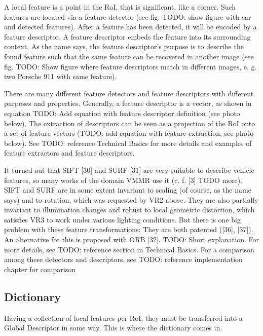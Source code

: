 A local feature is a point in the RoI, that is significant, like a corner. Such features are located via a feature detector (see fig. TODO: show figure with car and detected features). After a feature has been detected, it will be encoded by a feature descriptor. A feature descriptor embeds the feature into its surrounding context. As the name says, the feature descriptor’s purpose is to describe the found feature such that the same feature can be recovered in another image (see fig. TODO: Show figure where feature descriptors match in different images, e. g. two Porsche 911 with same feature).

There are many different feature detectors and feature descriptors with different purposes and properties. Generally, a feature descriptor is a vector, as shown in equation TODO: Add equation with feature descriptor definition (see photo below). The extraction of descriptors can be seen as a projection of the RoI onto a set of feature vectors (TODO: add equation with feature extraction, see photo below). See TODO: reference Technical Basics for more details and examples of feature extractors and feature descriptors.

It turned out that SIFT [30] and SURF [31] are very suitable to describe vehicle features, so many works of the domain VMMR use it (c. f. [3] TODO more). SIFT and SURF are in some extent invariant to scaling (of course, as the name says) and to rotation, which was requested by VR2 above. They are also partially invariant to illumination changes and robust to local geometric distortion, which satisfies VR3 to work under various lighting conditions. But there is one big problem with these feature transformations: They are both patented ([36], [37]). An alternative for this is proposed with ORB [32]. TODO: Short explanation. For more details, see TODO: reference section in Technical Basics. For a comparison among these detectors and descriptors, see TODO: reference implementation chapter for comparison

\subsection{Dictionary}
Having a collection of local features per RoI, they must be transferred into a Global Descriptor in some way. This is where the dictionary comes in.

